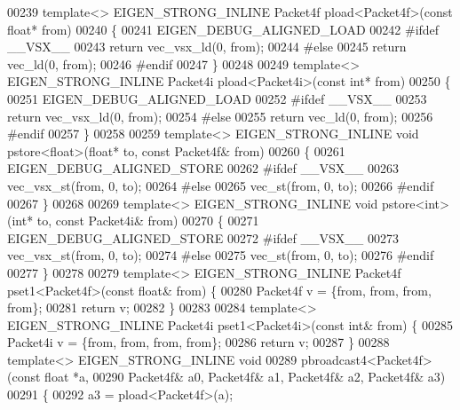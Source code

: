 \begin{DoxyCode}
{00239 \textcolor{keyword}{template}<> EIGEN\_STRONG\_INLINE Packet4f pload<Packet4f>(\textcolor{keyword}{const} \textcolor{keywordtype}{float}* from)
00240 \{
00241   EIGEN\_DEBUG\_ALIGNED\_LOAD
00242 \textcolor{preprocessor}{#ifdef \_\_VSX\_\_}
00243   \textcolor{keywordflow}{return} vec\_vsx\_ld(0, from);
00244 \textcolor{preprocessor}{#else}
00245   \textcolor{keywordflow}{return} vec\_ld(0, from);
00246 \textcolor{preprocessor}{#endif}
00247 \}
00248 
00249 \textcolor{keyword}{template}<> EIGEN\_STRONG\_INLINE Packet4i pload<Packet4i>(\textcolor{keyword}{const} \textcolor{keywordtype}{int}*     from)
00250 \{
00251   EIGEN\_DEBUG\_ALIGNED\_LOAD
00252 \textcolor{preprocessor}{#ifdef \_\_VSX\_\_}
00253   \textcolor{keywordflow}{return} vec\_vsx\_ld(0, from);
00254 \textcolor{preprocessor}{#else}
00255   \textcolor{keywordflow}{return} vec\_ld(0, from);
00256 \textcolor{preprocessor}{#endif}
00257 \}
00258 
00259 \textcolor{keyword}{template}<> EIGEN\_STRONG\_INLINE \textcolor{keywordtype}{void} pstore<float>(\textcolor{keywordtype}{float}*   to, \textcolor{keyword}{const} Packet4f& from)
00260 \{
00261   EIGEN\_DEBUG\_ALIGNED\_STORE
00262 \textcolor{preprocessor}{#ifdef \_\_VSX\_\_}
00263   vec\_vsx\_st(from, 0, to);
00264 \textcolor{preprocessor}{#else}
00265   vec\_st(from, 0, to);
00266 \textcolor{preprocessor}{#endif}
00267 \}
00268 
00269 \textcolor{keyword}{template}<> EIGEN\_STRONG\_INLINE \textcolor{keywordtype}{void} pstore<int>(\textcolor{keywordtype}{int}*       to, \textcolor{keyword}{const} Packet4i& from)
00270 \{
00271   EIGEN\_DEBUG\_ALIGNED\_STORE
00272 \textcolor{preprocessor}{#ifdef \_\_VSX\_\_}
00273   vec\_vsx\_st(from, 0, to);
00274 \textcolor{preprocessor}{#else}
00275   vec\_st(from, 0, to);
00276 \textcolor{preprocessor}{#endif}
00277 \}
00278 
00279 \textcolor{keyword}{template}<> EIGEN\_STRONG\_INLINE Packet4f pset1<Packet4f>(\textcolor{keyword}{const} \textcolor{keywordtype}{float}&  from) \{
00280   Packet4f v = \{from, from, from, from\};
00281   \textcolor{keywordflow}{return} v;
00282 \}
00283 
00284 \textcolor{keyword}{template}<> EIGEN\_STRONG\_INLINE Packet4i pset1<Packet4i>(\textcolor{keyword}{const} \textcolor{keywordtype}{int}&    from)   \{
00285   Packet4i v = \{from, from, from, from\};
00286   \textcolor{keywordflow}{return} v;
00287 \}
00288 \textcolor{keyword}{template}<> EIGEN\_STRONG\_INLINE \textcolor{keywordtype}{void}
00289 pbroadcast4<Packet4f>(\textcolor{keyword}{const} \textcolor{keywordtype}{float} *a,
00290                       Packet4f& a0, Packet4f& a1, Packet4f& a2, Packet4f& a3)
00291 \{
00292   a3 = pload<Packet4f>(a);
}
\end{DoxyCode}
